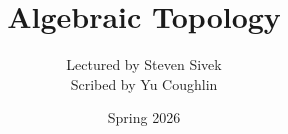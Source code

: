 \documentclass{article}
\begin{document}
\title{Algebraic Topology}
\author{Lectured by Steven Sivek \\
Scribed by Yu Coughlin}
\date{Spring 2026}

\maketitle

\tableofcontents
\end{document}
